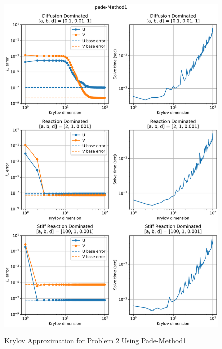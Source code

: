 \begin{figure}[t]
  \centering
  \includegraphics[width=5.75in]{images/pade-Method1KrylovProblem2.png}\\
  \caption{Krylov Approximation for Problem 2 Using Pade-Method1}
  \label{fig:errorProblem2padeM1Krylov}
\end{figure} 

